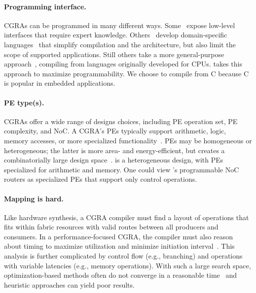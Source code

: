 \paragraph{Programming interface.}
CGRAs can be programmed in many different ways.
% 
Some~\cite{snafu,dally:ieee08:elm} expose low-level interfaces that require expert knowledge.
% 
Others~\cite{plasticine} develop domain-specific languages~\cite{sujeeth2014delite} that simplify compilation and the architecture, but also limit the scope of supported applications.
% 
Still others take a more general-purpose approach~\cite{swanson2003wavescalar},
compiling from languages originally developed for CPUs.
% 
\riptide takes this approach to maximize programmability.
We choose to compile from C because C is popular in embedded applications.

\paragraph{PE type(s).}
CGRAs offer a wide range of designs choices, including PE
operation set, PE complexity, and NoC.
%
A CGRA's PEs typically support arithmetic, logic, memory accesses,
%
or more specialized functionality~\cite{snafu,weng2020dsagen,dadu2019towards,q100,gorgon,capstan,polygraph,taskstream}.
%
PEs may be homogeneous or heterogeneous; the latter is more area- and
energy-efficient, but creates a combinatorially large design space~\cite{revamp}.
%
\riptide is a heterogeneous design, with PEs specialized for
arithmetic and memory.
%
One could view \riptide's programmable NoC routers
as specialized PEs that support only control operations.

\paragraph{Mapping is hard.}
Like hardware synthesis, a CGRA compiler must find a layout of
operations that fits within fabric resources with valid routes between
all producers and consumers.
%
In a performance-focused CGRA, the compiler must also reason
about timing to maximize utilization and minimize
initiation interval~\cite{pathseeker,chordmap,lee2021ultra,himap,4dcgra,amp2020,ureca,balasubramanian2018laser,pager2015software,hamzeh2012epimap,karunaratne2018dnestmap}.
% 
This analysis is further complicated by control flow (e.g., branching) and operations with variable latencies (e.g., memory operations).
%
With such a large search space, optimization-based methods often
do not converge in a reasonable time~\cite{hybrid-sched,nowatzki2013general} and heuristic approaches can yield poor results.
% 

